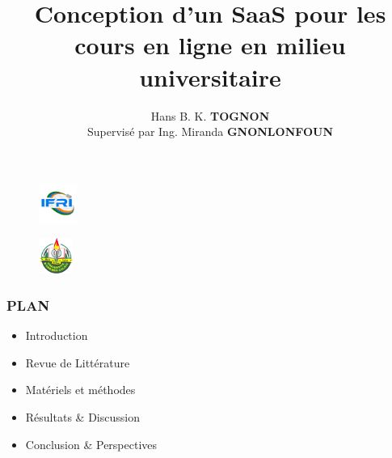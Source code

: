 \documentclass{beamer}
\title{Conception d'un SaaS pour les cours en ligne en milieu universitaire}
\author[Hans TOGNON]{Hans B. K. \textbf{TOGNON} \\ Supervisé par Ing. Miranda \textbf{GNONLONFOUN}}
\institute[IFRI]{
\textbf{I}nstitut de \textbf{F}ormation et de \textbf{R}echerche en  \textbf{I}nformatique \\
\medskip
}
\begin{document}
\begin{frame}
  \thispagestyle{empty}
  \begin{multicols}{2}
    \begin{figure}
        \flushleft
        \includegraphics[width=0.11\textwidth]{logoifri}
    \end{figure}
    \begin{figure}
        \flushright
        \includegraphics[width=0.1\textwidth]{logouac}
    \end{figure}
    \end{multicols}
    \vspace{-1cm}
  \titlepage
  \end{frame}

\begin{frame}
  \frametitle{PLAN}
  \begin{itemize}
    \item Introduction
    \item Revue de Littérature
    \item Matériels et méthodes
    \item Résultats \& Discussion
    \item Conclusion \& Perspectives
  \end{itemize}
\end{frame}



\end{document}
